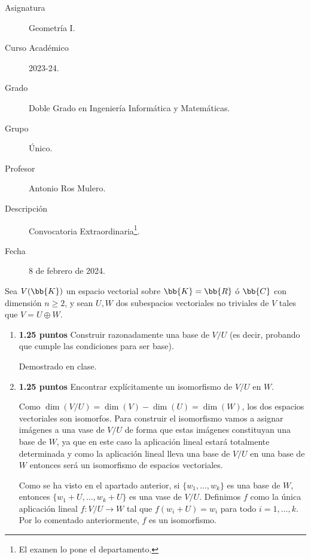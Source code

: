 \documentclass[12pt]{article}
\begin{document}

    
    

    \begin{description}
        \item[Asignatura] Geometría I.
        \item[Curso Académico] 2023-24.
        \item[Grado] Doble Grado en Ingeniería Informática y Matemáticas.
        \item[Grupo] Único.
        \item[Profesor] Antonio Ros Mulero.
        \item[Descripción] Convocatoria Extraordinaria\footnote{El examen lo pone el departamento.}.
        \item[Fecha] 8 de febrero de 2024.
    \end{description}
    \newpage

    \begin{ejercicio}[2.5 puntos]
        Sea $V(\bb{K})$ un espacio vectorial sobre $\bb{K} = \bb{R}$ ó $\bb{C}$ con dimensión $n\geq 2$, y sean $U,W$ dos subespacios vectoriales no triviales de $V$ tales que $V = U \oplus W$.

        \begin{enumerate}
            \item \textbf{1.25 puntos} Construir razonadamente una base de $V/U$ (es decir, probando que cumple las condiciones para ser base).
            
            Demostrado en clase.

            \item \textbf{1.25 puntos} Encontrar explícitamente un isomorfismo de $V/U$ en $W$.
            
            Como $\dim(V/U) = \dim(V) - \dim(U) = \dim(W)$, los dos espacios vectoriales son isomorfos. Para construir el isomorfismo vamos a asignar imágenes a una vase de $V/U$ de forma que estas imágenes constituyan una base de $W$, ya que en este caso la aplicación lineal estará totalmente determinada y como la aplicación lineal lleva una base de $V/U$ en una base de $W$ entonces será un isomorfismo de espacios vectoriales.

            Como se ha visto en el apartado anterior, si $\{w_1, \dots, w_k\}$ es una base de $W$, entonces $\{w_1 + U, \dots, w_k + U\}$ es una vase de $V/U$. Definimos $f$ como la única aplicación lineal $f : V/U \rightarrow W$ tal que $f(w_i+U) = w_i$ para todo $i = 1, \dots, k$. Por lo comentado anteriormente, $f$ es un isomorfismo.
        \end{enumerate}
    \end{ejercicio}
\end{document}
